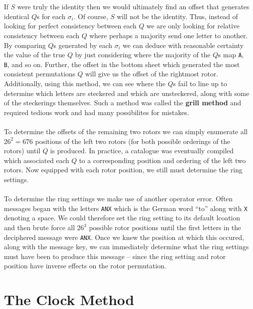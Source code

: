 \\\\If $S$ were truly the identity then we would ultimately find an offset that generates identical $Q$s for each $\sigma_i$. Of course, $S$ will not be the identity. Thus, instead of looking for perfect consistency between each $Q$ we are only looking for relative consistency between each $Q$ where perhaps a majority send one letter to another. By comparing $Q$s generated by each $\sigma_i$ we can deduce with reasonable certainty the value of the true $Q$ by just considering where the majority of the $Q$s map \texttt{A}, \texttt{B}, and so on. Further, the offset in the bottom sheet which generated the most consistent permutations $Q$ will give us the offset of the rightmost rotor. Additionally, using this method, we can see where the $Q$s fail to line up to determine which letters are steckered and which are unsteckered, along with some of the steckerings themselves. Such a method was called the {\bf{grill method}} and required tedious work and had many possibilites for mistakes.
\\\\To determine the offsets of the remaining two rotors we can simply enumerate all $26^2 = 676$ positions of the left two rotors (for both possible orderings of the rotors) until $Q$ is produced. In practice, a catalogue was eventually compiled which associated each $Q$ to a corresponding position and ordering of the left two rotors. Now equipped with each rotor position, we still must determine the ring settings.
\\\\To determine the ring settings we make use of another operator error. Often messages began with the letters \texttt{ANX} which is the German word ``to'' along with \texttt{X} denoting a space. We could therefore set the ring setting to its default lcoation and then brute force all $26^3$ possible rotor positions until the first letters in the deciphered message were \texttt{ANX}. Once we knew the position at which this occured, along with the message key, we can immediately determine what the ring settings must have been to produce this message -- since the ring setting and rotor position have inverse effects on the rotor permutation.

\section{The Clock Method}

